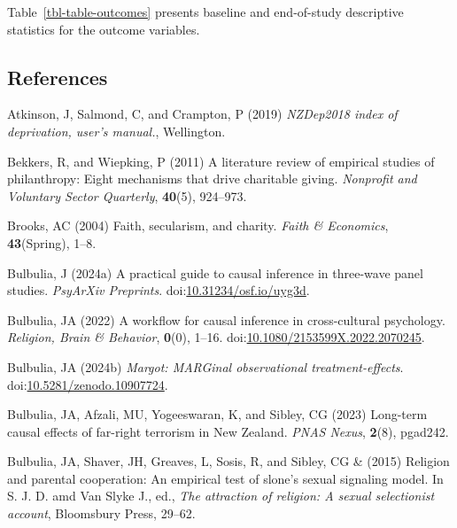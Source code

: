 \documentclass[
  single column]{article}
\newlength{\cslhangindent}
\newenvironment{CSLReferences}[2] %
 {\begin{list}{}{%
  \setlength{\itemindent}{0pt}
  \setlength{\leftmargin}{0pt}
  \setlength{\parsep}{0pt}
  \ifodd #1
   \setlength{\leftmargin}{\cslhangindent}
   \setlength{\itemindent}{-1\cslhangindent}
  \fi
  \setlength{\itemsep}{#2\baselineskip}}}
 {\end{list}}
\begin{document}
Table~\ref{tbl-table-outcomes} presents baseline and end-of-study
descriptive statistics for the outcome variables.

\newpage{}

\subsection*{References}\label{references}

\label{refs}
\begin{CSLReferences}{1}{0}
Atkinson, J, Salmond, C, and Crampton, P (2019) \emph{NZDep2018 index of
deprivation, user{'}s manual.}, Wellington.

Bekkers, R, and Wiepking, P (2011) A literature review of empirical
studies of philanthropy: Eight mechanisms that drive charitable giving.
\emph{Nonprofit and Voluntary Sector Quarterly}, \textbf{40}(5),
924--973.

Brooks, AC (2004) Faith, secularism, and charity. \emph{Faith \&
Economics}, \textbf{43}(Spring), 1--8.

Bulbulia, J (2024a) A practical guide to causal inference in three-wave
panel studies. \emph{PsyArXiv Preprints}.
doi:\href{https://doi.org/10.31234/osf.io/uyg3d}{10.31234/osf.io/uyg3d}.

Bulbulia, JA (2022) A workflow for causal inference in cross-cultural
psychology. \emph{Religion, Brain \& Behavior}, \textbf{0}(0), 1--16.
doi:\href{https://doi.org/10.1080/2153599X.2022.2070245}{10.1080/2153599X.2022.2070245}.

Bulbulia, JA (2024b) \emph{Margot: MARGinal observational
treatment-effects}.
doi:\href{https://doi.org/10.5281/zenodo.10907724}{10.5281/zenodo.10907724}.

Bulbulia, JA, Afzali, MU, Yogeeswaran, K, and Sibley, CG (2023)
Long-term causal effects of far-right terrorism in {N}ew {Z}ealand.
\emph{PNAS Nexus}, \textbf{2}(8), pgad242.

Bulbulia, JA, Shaver, JH, Greaves, L, Sosis, R, and Sibley, CG \& (2015)
Religion and parental cooperation: An empirical test of slone's sexual
signaling model. In S. J. D. amd Van Slyke J., ed., \emph{The attraction
of religion: A sexual selectionist account}, Bloomsbury Press, 29--62.


\end{CSLReferences}
\end{document}

